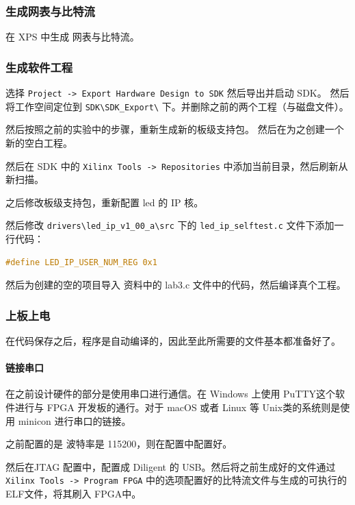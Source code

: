 \documentclass{ctexart}
\begin{document}
\subsubsection{生成网表与比特流}

在 XPS 中生成 网表与比特流。

\subsubsection{生成软件工程}

选择 \verb|Project -> Export Hardware Design to SDK| 然后导出并启动 SDK。
然后将工作空间定位到 \verb|SDK\SDK_Export\| 下。并删除之前的两个工程（与磁盘文件）。

然后按照之前的实验中的步骤，重新生成新的板级支持包。
然后在为之创建一个新的空白工程。

然后在 SDK 中的 \verb|Xilinx Tools -> Repositories| 中添加当前目录，然后刷新从新扫描。

之后修改板级支持包，重新配置 led 的 IP 核。

然后修改 \verb|drivers\led_ip_v1_00_a\src| 下的 \verb|led_ip_selftest.c| 文件下添加一行代码：
\begin{lstlisting}[language=C]
#define LED_IP_USER_NUM_REG 0x1
\end{lstlisting}

然后为创建的空的项目导入 资料中的 lab3.c 文件中的代码，然后编译真个工程。



\subsubsection{上板上电}

在代码保存之后，程序是自动编译的，因此至此所需要的文件基本都准备好了。
        
        \paragraph{链接串口}
        
        在之前设计硬件的部分是使用串口进行通信。在 Windows 上使用
        PuTTY这个软件进行与 FPGA 开发板的通行。对于 macOS 或者 Linux
        等 Unix类的系统则是使用 minicon 进行串口的链接。
        
        之前配置的是 波特率是 115200，则在配置中配置好。
        
        然后在JTAG 配置中，配置成 Diligent 的 USB。然后将之前生成好的文件通过
        \verb|Xilinx Tools -> Program FPGA|  中的选项配置好的比特流文件与生成的可执行的ELF文件，将其刷入 FPGA中。
\end{document}

